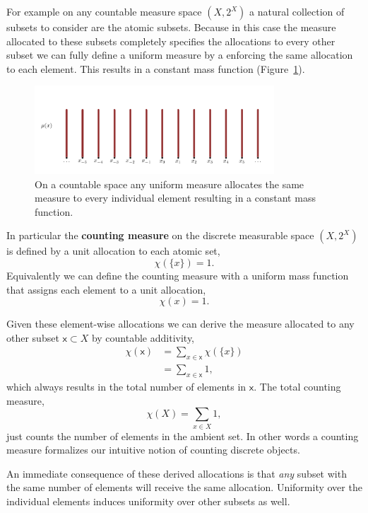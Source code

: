 \documentclass[
  letterpaper,
  DIV=11,
  numbers=noendperiod]{scrartcl}
\begin{document}
For example on any countable measure space \((X, 2^{X})\) a natural
collection of subsets to consider are the atomic subsets. Because in
this case the measure allocated to these subsets completely specifies
the allocations to every other subset we can fully define a uniform
measure by a enforcing the same allocation to each element. This results
in a constant mass function (Figure~\ref{fig-uniform-mass-function}).

\begin{figure}

{\centering \includegraphics[width=0.8\textwidth,height=\textheight]{figures/uniform_mass_function/uniform_mass_function.pdf}

}

\caption{\label{fig-uniform-mass-function}On a countable space any
uniform measure allocates the same measure to every individual element
resulting in a constant mass function.}

\end{figure}

In particular the \textbf{counting measure} on the discrete measurable
space \((X, 2^{X})\) is defined by a unit allocation to each atomic set,
\[
\chi(\{ x \}) = 1.
\] Equivalently we can define the counting measure with a uniform mass
function that assigns each element to a unit allocation, \[
\chi(x) = 1.
\]

Given these element-wise allocations we can derive the measure allocated
to any other subset \(\mathsf{x} \subset X\) by countable additivity,
\begin{align*}
\chi( \mathsf{x} )
&= \sum_{x \in \mathsf{x}} \chi(\{ x \})
\\
&= \sum_{x \in \mathsf{x}} 1,
\end{align*} which always results in the total number of elements in
\(\mathsf{x}\). The total counting measure, \[
\chi( X ) = \sum_{x \in X} 1,
\] just counts the number of elements in the ambient set. In other words
a counting measure formalizes our intuitive notion of counting discrete
objects.

An immediate consequence of these derived allocations is that \emph{any}
subset with the same number of elements will receive the same
allocation. Uniformity over the individual elements induces uniformity
over other subsets as well.
\end{document}
